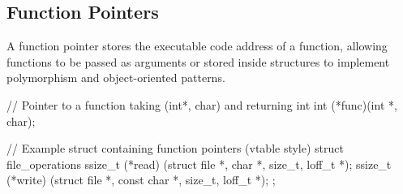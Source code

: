 \subsection{Function Pointers}

\begin{definition}
    A function pointer stores the executable code address of a function, allowing functions to be passed as arguments or stored inside structures to implement polymorphism and object-oriented patterns.
\end{definition}

\begin{codeexample}
// Pointer to a function taking (int*, char) and returning int
int (*func)(int *, char);

// Example struct containing function pointers (vtable style)
struct file_operations {
ssize_t (*read) (struct file *, char *, size_t, loff_t *);
ssize_t (*write) (struct file *, const char *, size_t, loff_t *);
};
\end{codeexample}
